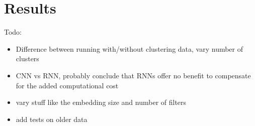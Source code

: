 \chapter{Results}
Todo:
\begin{itemize}
  \item Difference between running with/without clustering data, vary number of clusters
  \item CNN vs RNN, probably conclude that RNNs offer no benefit to compensate
    for the added computational cost
  \item vary stuff like the embedding size and number of filters
  \item add tests on older data
\end{itemize}

